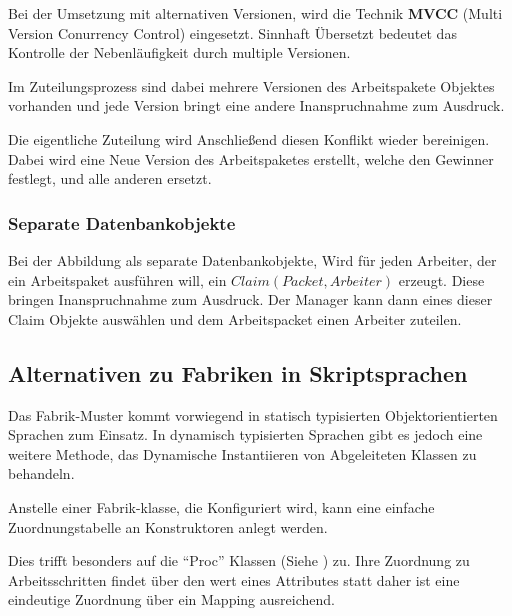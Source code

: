 Bei der Umsetzung mit alternativen Versionen, wird die Technik \textbf{MVCC} (Multi Version Conurrency Control) eingesetzt.
Sinnhaft Übersetzt bedeutet das Kontrolle der Nebenläufigkeit durch multiple Versionen.

Im Zuteilungsprozess sind dabei mehrere Versionen des Arbeitspakete Objektes vorhanden und jede Version bringt eine andere Inanspruchnahme zum Ausdruck.

Die eigentliche Zuteilung wird Anschließend diesen Konflikt wieder bereinigen.
Dabei wird eine Neue Version des Arbeitspaketes erstellt, welche den Gewinner festlegt, und alle anderen ersetzt.

\subsubsection{Separate Datenbankobjekte}

Bei der Abbildung als separate Datenbankobjekte,
Wird für jeden Arbeiter, der ein Arbeitspaket ausführen will, ein $Claim(Packet, Arbeiter)$ erzeugt. Diese bringen Inanspruchnahme zum Ausdruck.
Der Manager kann dann eines dieser Claim Objekte auswählen und dem Arbeitspacket einen Arbeiter zuteilen.


\subsection{Alternativen zu Fabriken in Skriptsprachen}

Das Fabrik-Muster kommt vorwiegend in statisch typisierten Objektorientierten Sprachen zum Einsatz. In dynamisch typisierten Sprachen gibt es jedoch eine weitere Methode, das Dynamische Instantiieren von Abgeleiteten Klassen zu behandeln.

Anstelle einer Fabrik-klasse, die Konfiguriert wird,
kann eine einfache Zuordnungstabelle an Konstruktoren anlegt werden.

Dies trifft besonders auf die ``Proc'' Klassen (Siehe ) zu.
Ihre Zuordnung zu Arbeitsschritten findet über den wert eines Attributes statt
daher ist eine eindeutige Zuordnung über ein Mapping ausreichend.


